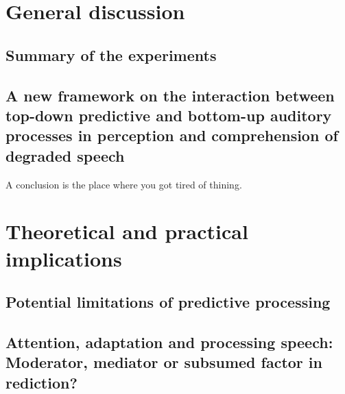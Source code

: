 \documentclass[a4paper, nobind]{templates/ociamthesis}
\begin{document}
\minitoc

\hypertarget{general-discussion-2}{%
\chapter{General discussion}\label{general-discussion-2}}

\hypertarget{summary-of-the-experiments}{%
\section{Summary of the experiments}\label{summary-of-the-experiments}}

\hypertarget{a-new-framework-on-the-interaction-between-top-down-predictive-and-bottom-up-auditory-processes-in-perception-and-comprehension-of-degraded-speech}{%
\section{A new framework on the interaction between top-down predictive and bottom-up auditory processes in perception and comprehension of degraded speech}\label{a-new-framework-on-the-interaction-between-top-down-predictive-and-bottom-up-auditory-processes-in-perception-and-comprehension-of-degraded-speech}}

\minitoc 

\begin{savequote}
A conclusion is the place where you got tired of thining.
\end{savequote}



\hypertarget{theoretical-and-practical-implications}{%
\chapter{Theoretical and practical implications}\label{theoretical-and-practical-implications}}

\hypertarget{potential-limitations-of-predictive-processing}{%
\section{Potential limitations of predictive processing}\label{potential-limitations-of-predictive-processing}}

\hypertarget{attention-adaptation-and-processing-speech-moderator-mediator-or-subsumed-factor-in-rediction}{%
\section{Attention, adaptation and processing speech: Moderator, mediator or subsumed factor in rediction?}\label{attention-adaptation-and-processing-speech-moderator-mediator-or-subsumed-factor-in-rediction}}
\end{document}
